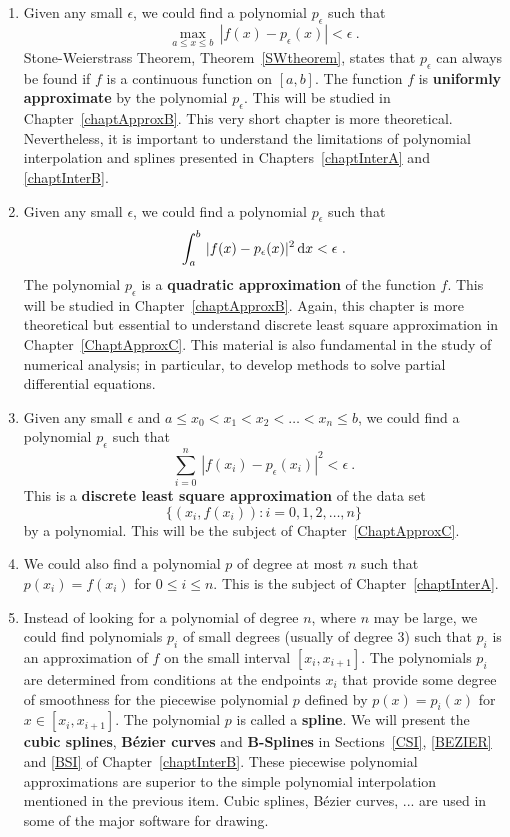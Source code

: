 \begin{enumerate}
\item Given any small $\epsilon$, we could find a polynomial
$p_\epsilon$ such that
\[
\max_{a\leq x \leq b} \,|f(x) - p_\epsilon(x)| < \epsilon \ .
\]
Stone-Weierstrass Theorem, Theorem~\ref{SWtheorem}, states that
$p_\epsilon$ can always be found if $f$ is a continuous function on
$[a,b]$.  The function $f$ is {\bfseries uniformly approximate}
by the polynomial $p_\epsilon$.  This will
be studied in Chapter~\ref{chaptApproxB}.  This very short
chapter is more theoretical.  Nevertheless, it is important to
understand the limitations of polynomial interpolation and splines
presented in Chapters~\ref{chaptInterA} and \ref{chaptInterB}.
\item Given any small $\epsilon$, we could find a polynomial
$p_\epsilon$ such that
\[
\int_a^b \,|f(x) - p_\epsilon(x)|^2 \,\mathrm{d}x < \epsilon \ .
\]
The polynomial $p_\epsilon$ is a {\bfseries quadratic approximation}
of the function $f$.  This will be studied in Chapter~\ref{chaptApproxB}.
Again, this chapter is more theoretical but essential to understand
discrete least square approximation in Chapter~\ref{ChaptApproxC}.
This material is also fundamental in the study of numerical analysis;
in particular, to develop methods to solve partial differential
equations.
\item Given any small $\epsilon$ and
$a \leq x_0 < x_1 < x_2 < \ldots < x_n \leq b$, we could find a polynomial
$p_\epsilon$ such that
\[
\sum_{i=0}^n \,|f(x_i) - p_\epsilon(x_i)|^2 < \epsilon \ .
\]
This is a {\bfseries discrete least square approximation}
of the data set
\[
\{(x_i,f(x_i)) : i=0,1,2,\ldots, n\}
\]
by a polynomial.  This will be the subject of Chapter~\ref{ChaptApproxC}.
\item We could also find a polynomial $p$ of degree at most
$n$ such that $p(x_i) = f(x_i)$ for $0 \leq i \leq n$.  This is the
subject of Chapter~\ref{chaptInterA}.
\item Instead of looking for a polynomial of degree $n$, where $n$ may
be large, we could find polynomials $p_i$ of small degrees (usually of
degree $3$) such that $p_i$ is an approximation of $f$ on the small
interval $[x_i,x_{i+1}]$.  The polynomials $p_i$ are determined from
conditions at the endpoints $x_i$ that provide some degree of
smoothness for the piecewise polynomial $p$ defined by $p(x) = p_i(x)$
for $x\in [x_i, x_{i+1}]$.  The polynomial $p$ is called a
{\bfseries spline}.   We will present the
{\bfseries cubic splines}, {\bfseries B\'ezier curves} and
{\bfseries B-Splines} in Sections~\ref{CSI}, \ref{BEZIER} and \ref{BSI} of
Chapter~\ref{chaptInterB}.  These piecewise polynomial approximations
are superior to the simple polynomial interpolation mentioned in the
previous item.  Cubic splines, B\'ezier curves, ... are used in some
of the major software for drawing.
\end{enumerate}

